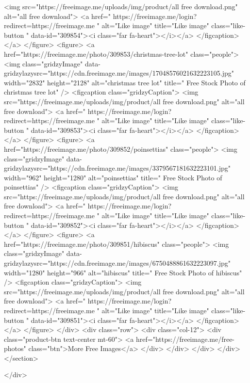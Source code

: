 <img src="https://freeimage.me/uploads/img/product/all free download.png" alt="all free download">
<a href=" https://freeimage.me/login?redirect=https://freeimage.me " alt="Like image" title="Like image" class="like-button  " data-id="309854"><i class="far fa-heart"></i></a>
</figcaption>
</a>
</figure>
<figure>
<a href="https://freeimage.me/photo/309853/christmas-tree-lot" class="people">
<img class="gridzyImage" data-gridzylazysrc="https://cdn.freeimage.me/images/17048576021632223105.jpg" width="2832" height="2128" alt="christmas tree lot" title=" Free Stock Photo of christmas tree lot" />
<figcaption class="gridzyCaption">
<img src="https://freeimage.me/uploads/img/product/all free download.png" alt="all free download">
<a href=" https://freeimage.me/login?redirect=https://freeimage.me " alt="Like image" title="Like image" class="like-button  " data-id="309853"><i class="far fa-heart"></i></a>
</figcaption>
</a>
</figure>
<figure>
<a href="https://freeimage.me/photo/309852/poinsettias" class="people">
<img class="gridzyImage" data-gridzylazysrc="https://cdn.freeimage.me/images/3379567181632223101.jpg" width="962" height="1280" alt="poinsettias" title=" Free Stock Photo of poinsettias" />
<figcaption class="gridzyCaption">
<img src="https://freeimage.me/uploads/img/product/all free download.png" alt="all free download">
<a href=" https://freeimage.me/login?redirect=https://freeimage.me " alt="Like image" title="Like image" class="like-button  " data-id="309852"><i class="far fa-heart"></i></a>
</figcaption>
</a>
</figure>
<figure>
<a href="https://freeimage.me/photo/309851/hibiscus" class="people">
<img class="gridzyImage" data-gridzylazysrc="https://cdn.freeimage.me/images/6750488861632223097.jpg" width="1280" height="966" alt="hibiscus" title=" Free Stock Photo of hibiscus" />
<figcaption class="gridzyCaption">
<img src="https://freeimage.me/uploads/img/product/all free download.png" alt="all free download">
<a href=" https://freeimage.me/login?redirect=https://freeimage.me " alt="Like image" title="Like image" class="like-button  " data-id="309851"><i class="far fa-heart"></i></a>
 </figcaption>
</a>
</figure>
</div>
<div class="row">
<div class="col-12">
<div class="product-btn text-center mt-60">
<a href="https://freeimage.me/free-photos" class="btn">More Free Images</a>
</div>
</div>
</div>
</div>
</section>

</div>


